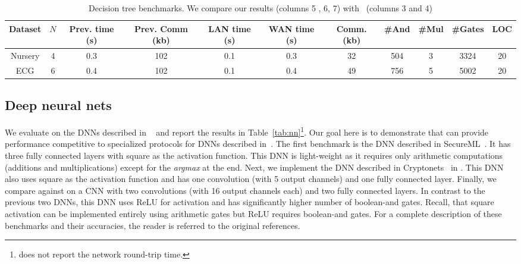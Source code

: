 \begin{table*}
\begin{tabular}{c|c|c|c |c|c|c|c|c|c|c}
Dataset  & $N$ & Prev. time (s) & Prev. Comm (kb) & LAN time (s) & WAN time (s) & Comm. (kb)  & \#And & \#Mul & \#Gates & LOC\\
\hline
Nursery & 4 & 0.3 & 102 & 0.1 & 0.3 & 32 & 504 & 3 & 3324 & 20\\
\hline
ECG &  6 & 0.4 & 102 & 0.1 & 0.4 & 49 & 756 & 5 & 5002 & 20\\
\hline
\end{tabular}

 \caption{Decision tree benchmarks. We compare our results (columns 5 , 6, 7) with~\cite{wu} (columns 3 and 4)}
 \label{tab:dt} 
\end{table*}



\subsection{Deep neural nets}
\label{sec:dnneval}
We evaluate \tool on the DNNs described in \minion~\cite{minionn} and
report the results in Table~\ref{tab:nn}\footnote{\minion does
  not report the network round-trip time.}.
Our goal here is to demonstrate that \tool
can provide performance competitive to specialized protocols for DNNs
described in~\cite{secureml,cryptonets,minionn}.  
The first benchmark  is the DNN described in SecureML~\cite{secureml}.
It has three fully connected layers with square as the activation function.
This DNN is light-weight as it requires only arithmetic computations
(additions and multiplications) 
except for the {\it argmax} at the end.
Next, we implement the DNN described in Cryptonets~\cite{cryptonets} in \tool.
This DNN also uses square as the activation function and has one
convolution (with 5 output channels) and one fully connected layer. 
Finally, we compare against \minion on a CNN
with two convolutions (with 16 output channels each) and two fully
connected layers. 
In contrast to the previous two DNNs, this DNN uses ReLU for activation and
has significantly higher number of boolean-and gates.
Recall, that square activation can be implemented entirely using
arithmetic gates but ReLU requires boolean-and gates.  For a complete
description of these benchmarks and their accuracies,  the reader is
referred to the original references. 

